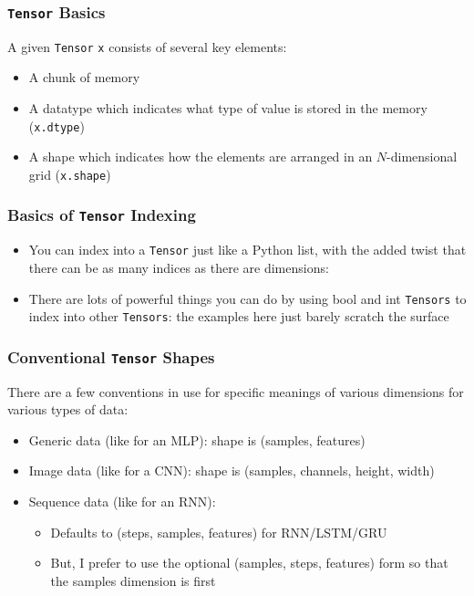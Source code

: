 \documentclass[xcolor={x11names,table}]{beamer}
\begin{document}
\begin{frame}
	\frametitle{\lstinline!Tensor! Basics}
	A given \lstinline!Tensor! \lstinline!x! consists of several key elements:
	\begin{itemize}
		\item A chunk of memory
		\item A datatype which indicates what type of value is stored in the memory (\lstinline!x.dtype!)
		\item A shape which indicates how the elements are arranged in an $N$-dimensional grid (\lstinline!x.shape!)
	\end{itemize}
\end{frame}

\begin{frame}
	\frametitle{Basics of \lstinline!Tensor! Indexing}
	\begin{itemize}
		\item You can index into a \lstinline!Tensor! just like a Python list, with the added twist that there can be as many indices as there are dimensions:
		
		\item There are lots of powerful things you can do by using bool and int \lstinline!Tensors! to index into other \lstinline!Tensors!: the examples here just barely scratch the surface
	\end{itemize}
\end{frame}

\begin{frame}
	\frametitle{Conventional \lstinline!Tensor! Shapes}
	There are a few conventions in use for specific meanings of various dimensions for various types of data:
	\begin{itemize}
		\item Generic data (like for an MLP): shape is (samples, features)
		\item Image data (like for a CNN): shape is (samples, channels, height, width)
		\item Sequence data (like for an RNN):
		\begin{itemize}
			\item Defaults to (steps, samples, features) for RNN/LSTM/GRU
			\item But, I prefer to use the optional (samples, steps, features) form so that the samples dimension is first
		\end{itemize}
	\end{itemize}
\end{frame}
\end{document}
